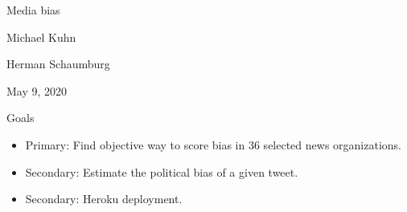 \documentclass[12pt]{article}
\theoremstyle{example}
\theoremstyle{defn}
\begin{document}
\pagestyle{fancy}
\setlength{\parindent}{0pt}
\setlength{\parskip}{12pt}
\setlength{\columnsep}{0.4in}
\thispagestyle{empty} %
\pagecolor{background}
\setcounter{page}{0}

\vspace*{\fill}




\setcounter{section}{14}
\setcounter{subsection}{3}

\setcounter{example}{0}

\vspace*{\fill}

\begin{center}
\begin{spacing}{1.5}
\begin{Large}
Media bias
\end{Large}
\end{spacing}


\vspace*{12pt}
{Michael Kuhn

Herman Schaumburg

May 9, 2020}


\end{center}

\vspace*{\fill}

\clearpage


{Goals}

\vspace*{-16pt}
\begin{footnotesize}
\begin{itemize}[\label{}]
\item Primary: Find objective way to score bias in 36 selected news organizations.
\item Secondary: Estimate the political bias of a given tweet.
\item Secondary: Heroku deployment.
\end{itemize}
\end{footnotesize}

\clearpage
\end{document}
